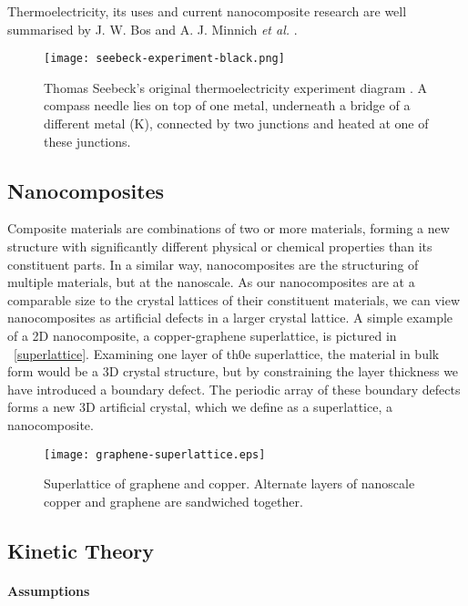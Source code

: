 \documentclass[12pt,draft]{article}
\newcommand{\figref}[2][\figurename~]{#1\ref{#2}}
\begin{document}
Thermoelectricity, its uses and current nanocomposite research are well summarised by J. W. Bos \cite{bos-review} and A. J. Minnich \emph{et al.} \cite{minnich-review}.

\begin{figure}
	\centering
	\texttt{[image: seebeck-experiment-black.png]}
	\caption{Thomas Seebeck's original thermoelectricity experiment diagram \cite{seebeck-original}. A compass needle lies on top of one metal, underneath a bridge of a different metal (K), connected by two junctions and heated at one of these junctions.}
	\label{fig:seebeck-experiment}
\end{figure}

\subsection{Nanocomposites}
Composite materials are combinations of two or more materials, forming a new structure with significantly different physical or chemical properties than its constituent parts. In a similar way, nanocomposites are the structuring of multiple materials, but at the nanoscale. As our nanocomposites are at a comparable size to the crystal lattices of their constituent materials, we can view nanocomposites as artificial defects in a larger crystal lattice. A simple example of a 2D nanocomposite, a copper-graphene superlattice, is pictured in \figref{superlattice}. Examining one layer of th0e superlattice, the material in bulk form would be a 3D crystal structure, but by constraining the layer thickness we have introduced a boundary defect. The periodic array of these boundary defects forms a new 3D artificial crystal, which we define as a superlattice, a nanocomposite.

\begin{figure}
	\centering
	\texttt{[image: graphene-superlattice.eps]}
	\caption{Superlattice of graphene and copper. Alternate layers of nanoscale copper and graphene are sandwiched together.}
	\label{fig:superlattice}
\end{figure}

\subsection{Kinetic Theory}
\paragraph{Assumptions}
\end{document}
